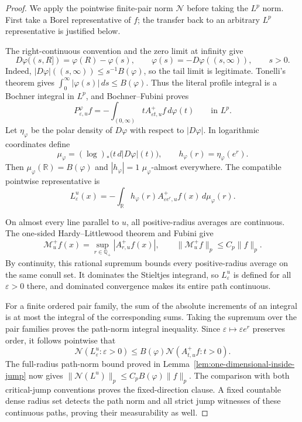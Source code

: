 \documentclass[11pt]{article}
\numberwithin{equation}{section}
\theoremstyle{remark}
\theoremstyle{definition}
\newcommand{\R}{\mathbb R}
\newcommand{\NN}{\mathcal N}
\begin{document}
\begin{proof}
We apply the pointwise finite-pair norm $\NN$ before taking the
$L^p$ norm. First take a Borel representative of $f$; the transfer back
to an arbitrary $L^p$ representative is justified below.

The right-continuous convention and the zero limit at infinity give
\[
 D\varphi((s,R])=\varphi(R)-\varphi(s),\qquad
 \varphi(s)=-D\varphi((s,\infty)),\qquad s>0.
\]
Indeed, $|D\varphi|((s,\infty))\le s^{-1}B(\varphi)$, so the tail
limit is legitimate.  Tonelli's theorem gives
$\int_0^\infty|\varphi(s)|\,ds\le B(\varphi)$.  Thus the literal
profile integral is a Bochner integral in $L^p$, and Bochner--Fubini
proves
\begin{equation}\label{eq:profile-stieltjes-representative}
 P^\varphi_{\varepsilon,u}f
 =-\int_{(0,\infty)}tA^+_{\varepsilon t,u}f\,d\varphi(t)
 \qquad\text{in }L^p.
\end{equation}
Let $\eta_\varphi$ be the polar density of $D\varphi$ with respect
to $|D\varphi|$. In logarithmic coordinates define
\[
 \mu_\varphi=(\log)_*\bigl(t\,d|D\varphi|(t)\bigr),\qquad
 h_\varphi(r)=\eta_\varphi(e^r).
\]
Then $\mu_\varphi(\mathbb R)=B(\varphi)$ and
$|h_\varphi|=1$ $\mu_\varphi$-almost everywhere.
The compatible pointwise representative is
\[
 L^u_\varepsilon(x)
 =-\int_\R h_\varphi(r)A^+_{\varepsilon e^r,u}f(x)
       \,d\mu_\varphi(r).
\]

On almost every line parallel to $u$, all positive-radius averages
are continuous.  The one-sided Hardy--Littlewood theorem and Fubini give
\begin{equation}\label{eq:directional-one-sided-maximal}
 \mathcal M_u^+f(x)=\sup_{r\in\mathbb Q_+}|A^+_{r,u}f(x)|,
 \qquad \|\mathcal M_u^+f\|_p\le C_p\|f\|_p.
\end{equation}
By continuity, this rational supremum bounds every positive-radius
average on the same conull set.  It dominates the Stieltjes integrand,
so $L^u_\varepsilon$ is defined for all $\varepsilon>0$ there, and
dominated convergence makes its entire path continuous.

For a finite ordered pair family, the sum of the absolute increments
of an integral is at most the integral of the corresponding sums.
Taking the supremum over the pair families proves the path-norm
integral inequality.  Since $\varepsilon\mapsto\varepsilon e^r$
preserves order, it follows pointwise that
\begin{equation}\label{eq:profile-finite-parameter-bound}
 \NN(L^u_\varepsilon:\varepsilon>0)
 \le B(\varphi)\NN(A^+_{t,u}f:t>0).
\end{equation}
The full-radius path-norm bound proved in
Lemma~\ref{lem:one-dimensional-inside-jump} now gives
$\|\NN(L^u)\|_p\le C_pB(\varphi)\|f\|_p$.  The comparison with
both critical-jump conventions proves the fixed-direction clause.
A fixed countable dense radius set detects the path norm and all
strict jump witnesses of these continuous paths, proving their
measurability as well.


\end{proof}
\end{document}
